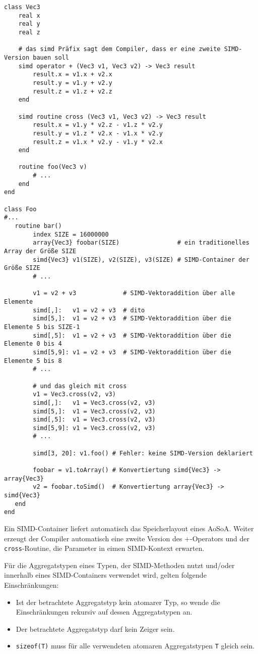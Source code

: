 \documentclass[a4paper,10pt]{article}
\begin{document}
\begin{verbatim}
class Vec3
    real x
    real y
    real z

    # das simd Präfix sagt dem Compiler, dass er eine zweite SIMD-Version bauen soll
    simd operator + (Vec3 v1, Vec3 v2) -> Vec3 result
        result.x = v1.x + v2.x
        result.y = v1.y + v2.y
        result.z = v1.z + v2.z
    end

    simd routine cross (Vec3 v1, Vec3 v2) -> Vec3 result
        result.x = v1.y * v2.z - v1.z * v2.y
        result.y = v1.z * v2.x - v1.x * v2.y
        result.z = v1.x * v2.y - v1.y * v2.x
    end

    routine foo(Vec3 v)
        # ...
    end
end

class Foo
#...
   routine bar()
        index SIZE = 16000000
        array{Vec3} foobar(SIZE)                # ein traditionelles Array der Größe SIZE
        simd{Vec3} v1(SIZE), v2(SIZE), v3(SIZE) # SIMD-Container der Größe SIZE
        # ...

        v1 = v2 + v3             # SIMD-Vektoraddition über alle Elemente
        simd[,]:   v1 = v2 + v3  # dito
        simd[5,]:  v1 = v2 + v3  # SIMD-Vektoraddition über die Elemente 5 bis SIZE-1
        simd[,5]:  v1 = v2 + v3  # SIMD-Vektoraddition über die Elemente 0 bis 4
        simd[5,9]: v1 = v2 + v3  # SIMD-Vektoraddition über die Elemente 5 bis 8
        # ...

        # und das gleich mit cross
        v1 = Vec3.cross(v2, v3)
        simd[,]:   v1 = Vec3.cross(v2, v3)
        simd[5,]:  v1 = Vec3.cross(v2, v3)
        simd[,5]:  v1 = Vec3.cross(v2, v3)
        simd[5,9]: v1 = Vec3.cross(v2, v3)
        # ...

        simd[3, 20]: v1.foo() # Fehler: keine SIMD-Version deklariert

        foobar = v1.toArray() # Konvertiertung simd{Vec3} -> array{Vec3}
        v2 = foobar.toSimd()  # Konvertiertung array{Vec3} -> simd{Vec3}
   end
end
\end{verbatim}

Ein SIMD-Container liefert automatisch das Speicherlayout eines AoSoA. Weiter erzeugt der Compiler
automatisch eine zweite Version des +-Operators und der \texttt{cross}-Routine, die Parameter in
eimen SIMD-Kontext erwarten.

Für die Aggregatstypen eines Typen, der SIMD-Methoden nutzt und/oder innerhalb eines
SIMD-Containers verwendet wird, gelten folgende Einschränkungen:

\begin{itemize}

    \item Ist der betrachtete Aggregatstyp kein atomarer Typ, so wende die Einschränkungen rekursiv
    auf dessen Aggregatstypen an.

    \item Der betrachtete Aggregatstyp darf kein Zeiger sein.

    \item \texttt{sizeof(T)} muss für alle verwendeten atomaren Aggregatstypen \texttt{T} gleich
    sein.

\end{itemize}
\end{document}
